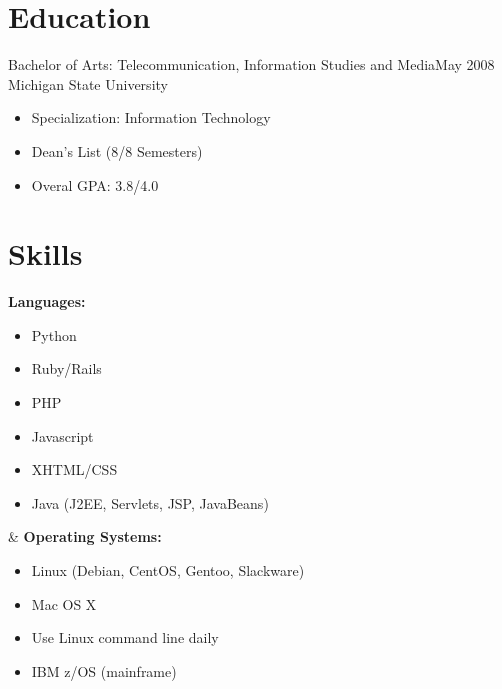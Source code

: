 \documentclass[]{res}
\begin{document}
\begin{resume}
\section{Education}
Bachelor of Arts: Telecommunication, Information Studies and Media\dotfill May 2008\\
Michigan State University
\begin{itemize}
\item Specialization: Information Technology
\item Dean's List (8/8 Semesters)
\item Overal GPA: 3.8/4.0
\end{itemize}


\section{Skills}
\begin{ncolumn}{2}
  {\bf Languages:}
  \begin{itemize}
  \item Python
  \item Ruby/Rails
  \item PHP
  \item Javascript
  \item XHTML/CSS
  \item Java (J2EE, Servlets, JSP, JavaBeans)
  \end{itemize}
&
  {\bf Operating Systems:}
  \begin{itemize}
  \item Linux (Debian, CentOS, Gentoo, Slackware)
  \item Mac OS X
  \item Use Linux command line daily
  \item IBM z/OS (mainframe)
  \end{itemize}
\end{ncolumn}


\end{resume}
\end{document}
